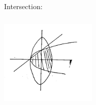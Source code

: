 Intersection:
\begin{marginfigure}
	\centering
	\includegraphics[width=1.8in,height=1.8in]{figures/ch07/figure1021_4.png}
\end{marginfigure}









